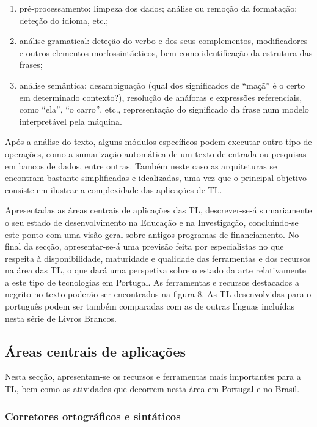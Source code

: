\begin{multicols}{2}
\begin{enumerate}
 \item pré-processamento: limpeza dos dados; análise ou remoção da formatação; deteção do idioma, etc.; 
      \item análise gramatical: deteção do verbo e dos seus complementos, modificadores e outros elementos morfossintácticos, bem como identificação da estrutura das frases; 
      \item análise semântica: desambiguação (qual dos significados de “maçã” é o certo em determinado contexto?), resolução de anáforas e expressões referenciais, como “ela”, “o carro”, etc., representação do significado da frase num modelo interpretável pela máquina.
\end{enumerate}

 Após a análise do texto, alguns módulos específicos podem executar outro tipo de operações, como a sumarização automática de um texto de entrada ou pesquisas em bancos de dados, entre outras. Também neste caso as arquiteturas se encontram bastante simplificadas e idealizadas, uma vez que o principal objetivo consiste em ilustrar a complexidade das aplicações de TL.

Apresentadas as áreas centrais de aplicações das TL, descrever-se-á sumariamente o seu estado de desenvolvimento na Educação e na Investigação, concluindo-se este ponto com uma visão geral sobre antigos programas de financiamento. No final da secção, apresentar-se-á uma previsão feita por especialistas no que respeita à disponibilidade, maturidade e qualidade das ferramentas e dos recursos na área das TL, o que dará uma perspetiva sobre o estado da arte relativamente a este tipo de tecnologias em Portugal. As ferramentas e recursos destacados a negrito no texto poderão ser encontrados na figura 8. As TL desenvolvidas para o português podem ser também comparadas com as de outras línguas incluídas nesta série de Livros Brancos.

\subsection{Áreas centrais de aplicações} 

Nesta secção, apresentam-se os recursos e ferramentas mais importantes para a TL, bem como as atividades que decorrem nesta área em Portugal e no Brasil.

\subsubsection{Corretores ortográficos e sintáticos}


\end{multicols}
